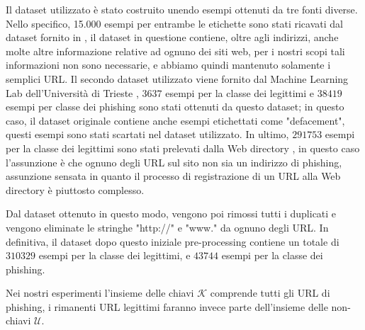 \documentclass[../../main.tex]{subfiles}
\begin{document}
    Il dataset utilizzato è stato costruito unendo esempi ottenuti da tre fonti diverse. Nello specifico, 15.000 esempi per entrambe le etichette sono stati ricavati dal dataset fornito in \cite{article}, il dataset in questione contiene, oltre agli indirizzi, anche molte altre informazione relative ad ognuno dei siti web, per i nostri scopi tali informazioni non sono necessarie, e abbiamo quindi mantenuto solamente i semplici URL. Il secondo dataset utilizzato viene fornito dal Machine Learning Lab dell'Università di Trieste \cite{machinelearninglab}, $3637$ esempi per la classe dei legittimi e $38419$ esempi per classe dei phishing sono stati ottenuti da questo dataset; in questo caso, il dataset originale contiene anche esempi etichettati come "defacement", questi esempi sono stati scartati nel dataset utilizzato. In ultimo, $291753$ esempi per la classe dei legittimi sono stati prelevati dalla Web directory \cite{botw}, in questo caso l'assunzione è che ognuno degli URL sul sito non sia un indirizzo di phishing, assunzione sensata in quanto il processo di registrazione di un URL alla Web directory è piuttosto complesso.

    Dal dataset ottenuto in questo modo, vengono poi rimossi tutti i duplicati e vengono eliminate le stringhe "http://" e "www." da ognuno degli URL. In definitiva, il dataset dopo questo iniziale pre-processing contiene un totale di $310329$ esempi per la classe dei legittimi, e $43744$ esempi per la classe dei phishing.

    Nei nostri esperimenti l'insieme delle chiavi $\mathcal{K}$ comprende tutti gli URL di phishing, i rimanenti URL legittimi faranno invece parte dell'insieme delle non-chiavi $\mathcal{U}$.
\end{document}
